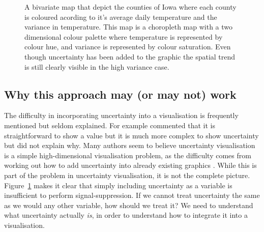 \documentclass[
  12pt]{article}
\begin{document}
\begin{figure}
\begin{minipage}{0.33\linewidth}
\end{minipage}%
%
\begin{minipage}{0.33\linewidth}



\end{minipage}%

\caption{\label{fig-bivariate}A bivariate map that depict the counties
of Iowa where each county is coloured acording to it's average daily
temperature and the variance in temperature. This map is a choropleth
map with a two dimensional colour palette where temperature is
represented by colour hue, and variance is represented by colour
saturation. Even though uncertainty has been added to the graphic the
spatial trend is still clearly visible in the high variance case.}

\end{figure}%

\subsection{Why this approach may (or may not)
work}\label{why-this-approach-may-or-may-not-work}

The difficulty in incorporating uncertainty into a visualisation is
frequently mentioned but seldom explained. For example
\citet{Hullman2016} commented that it is straightforward to show a value
but it is much more complex to show uncertainty but did not explain why.
Many authors seem to believe uncertainty visualisation is a simple
high-dimensional visualisation problem, as the difficulty comes from
working out how to add uncertainty into already existing graphics
\citep{Griethe2006}. While this is part of the problem in uncertainty
visualisation, it is not the complete picture.
Figure~\ref{fig-bivariate} makes it clear that simply including
uncertainty as a variable is insufficient to perform signal-suppression.
If we cannot treat uncertainty the same as we would any other variable,
how should we treat it? We need to understand what uncertainty actually
\emph{is}, in order to understand how to integrate it into a
visualisation.
\end{document}
